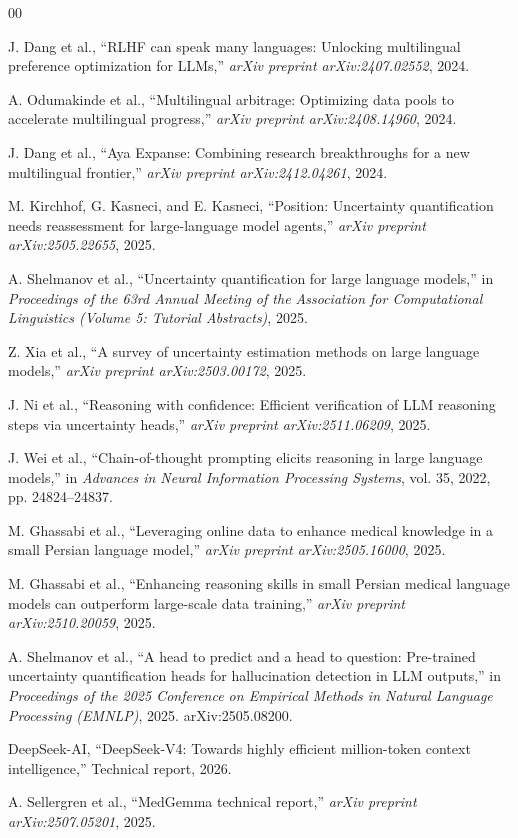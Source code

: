 \documentclass[conference]{IEEEtran}
\begin{document}
\begin{thebibliography}{00}

J. Dang et al., ``RLHF can speak many languages: Unlocking multilingual preference optimization for LLMs,'' \emph{arXiv preprint arXiv:2407.02552}, 2024.

A. Odumakinde et al., ``Multilingual arbitrage: Optimizing data pools to accelerate multilingual progress,'' \emph{arXiv preprint arXiv:2408.14960}, 2024.

J. Dang et al., ``Aya Expanse: Combining research breakthroughs for a new multilingual frontier,'' \emph{arXiv preprint arXiv:2412.04261}, 2024.

M. Kirchhof, G. Kasneci, and E. Kasneci, ``Position: Uncertainty quantification needs reassessment for large-language model agents,'' \emph{arXiv preprint arXiv:2505.22655}, 2025.

A. Shelmanov et al., ``Uncertainty quantification for large language models,'' in \emph{Proceedings of the 63rd Annual Meeting of the Association for Computational Linguistics (Volume 5: Tutorial Abstracts)}, 2025.

Z. Xia et al., ``A survey of uncertainty estimation methods on large language models,'' \emph{arXiv preprint arXiv:2503.00172}, 2025.

J. Ni et al., ``Reasoning with confidence: Efficient verification of LLM reasoning steps via uncertainty heads,'' \emph{arXiv preprint arXiv:2511.06209}, 2025.

J. Wei et al., ``Chain-of-thought prompting elicits reasoning in large language models,'' in \emph{Advances in Neural Information Processing Systems}, vol. 35, 2022, pp. 24824--24837.

M. Ghassabi et al., ``Leveraging online data to enhance medical knowledge in a small Persian language model,'' \emph{arXiv preprint arXiv:2505.16000}, 2025.

M. Ghassabi et al., ``Enhancing reasoning skills in small Persian medical language models can outperform large-scale data training,'' \emph{arXiv preprint arXiv:2510.20059}, 2025.

A. Shelmanov et al., ``A head to predict and a head to question: Pre-trained uncertainty quantification heads for hallucination detection in LLM outputs,'' in \emph{Proceedings of the 2025 Conference on Empirical Methods in Natural Language Processing (EMNLP)}, 2025. arXiv:2505.08200.

DeepSeek-AI, ``DeepSeek-V4: Towards highly efficient million-token context intelligence,'' Technical report, 2026.

A. Sellergren et al., ``MedGemma technical report,'' \emph{arXiv preprint arXiv:2507.05201}, 2025.

\end{thebibliography}
\end{document}
